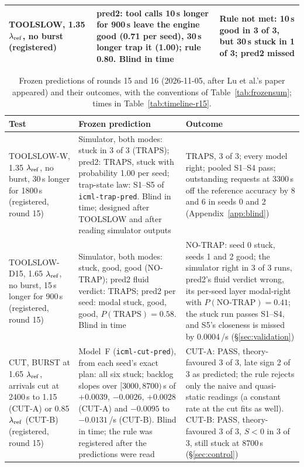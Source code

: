 \begin{table}[!tp]
\begin{tabular}{@{}>{\raggedright\arraybackslash}p{3.0cm} >{\raggedright\arraybackslash}p{7.4cm} >{\raggedright\arraybackslash}p{6.5cm}@{}}
\addlinespace[0.3pt]
TOOLSLOW, 1.35 $\lambda_{\mathrm{ref}}$, no burst (registered) & pred2: tool calls 10\,s longer for 900\,s leave the engine good (0.71 per seed), 30\,s longer trap it (1.00); rule 0.80. Blind in time & Rule not met: 10\,s good in 3 of 3, but 30\,s stuck in 1 of 3; pred2 missed\\
\bottomrule
\end{tabular}
\end{table}

\begin{table}[!tp]
\centering\footnotesize
\caption{Frozen predictions of rounds 15 and 16 (2026-11-05, after Lu et al.'s paper appeared) and their outcomes, with the conventions of Table~\ref{tab:frozensum}; times in Table~\ref{tab:timeline-r15}.}\label{tab:frozensum15}
\setlength{\tabcolsep}{3pt}
\begin{tabular}{@{}>{\raggedright\arraybackslash}p{3.0cm} >{\raggedright\arraybackslash}p{7.4cm} >{\raggedright\arraybackslash}p{6.5cm}@{}}
\toprule
Test & Frozen prediction & Outcome\\
\midrule
TOOLSLOW-W, 1.35 $\lambda_{\mathrm{ref}}$, no burst, 30\,s longer for 1800\,s (registered, round 15) & Simulator, both modes: stuck in 3 of 3 (TRAPS); pred2: TRAPS, stuck with probability 1.00 per seed; trap-state law: S1--S5 of \texttt{icml-trap-pred}. Blind in time; designed after TOOLSLOW and after reading simulator outputs & TRAPS, 3 of 3; every model right; pooled S1--S4 pass; outstanding requests at 3300\,s off the reference accuracy by 8 and 6 in seeds 0 and 2 (Appendix~\ref{app:blind})\\
\addlinespace[0.3pt]
TOOLSLOW-D15, 1.65 $\lambda_{\mathrm{ref}}$, no burst, 15\,s longer for 900\,s (registered, round 15) & Simulator, both modes: stuck, good, good (NO-TRAP); pred2 fluid verdict: TRAPS; pred2 per seed: modal stuck, good, good, $P(\text{TRAPS})=0.58$. Blind in time & NO-TRAP: seed 0 stuck, seeds 1 and 2 good; the simulator right in 3 of 3 runs, pred2's fluid verdict wrong, its per-seed layer modal-right with $P(\text{NO-TRAP})=0.41$; the stuck run passes S1--S4, and S5's closeness is missed by 0.0004\,/s (\S\ref{sec:validation})\\
\addlinespace[0.3pt]
CUT, BURST at 1.65 $\lambda_{\mathrm{ref}}$, arrivals cut at 2400\,s to 1.15 (CUT-A) or 0.85 $\lambda_{\mathrm{ref}}$ (CUT-B) (registered, round 15) & Model~F (\texttt{icml-cut-pred}), from each seed's exact plan: all six stuck; backlog slopes over $[3000,8700)$\,s of $+0.0039$, $-0.0026$, $+0.0028$ (CUT-A) and $-0.0095$ to $-0.0131$\,/s (CUT-B). Blind in time; the rule was registered after the predictions were read & CUT-A: PASS, theory-favoured 3 of 3, late sign 2 of 3 as predicted; the rule rejects only the naive and quasi-static readings (a constant rate at the cut fits as well). CUT-B: PASS, theory-favoured 3 of 3, $S<0$ in 3 of 3, still stuck at 8700\,s (\S\ref{sec:control})\\

\end{tabular}
\end{table}
